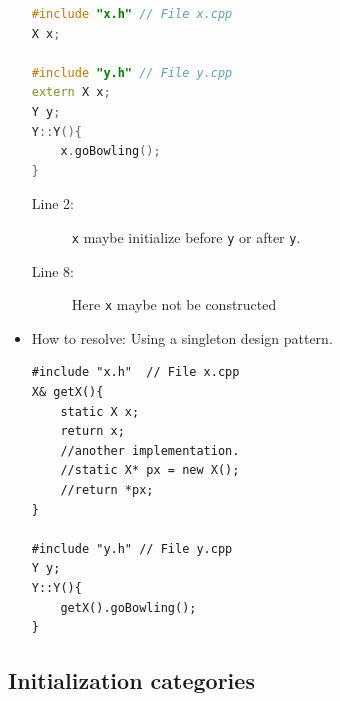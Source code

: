 \documentclass[a4paper,11pt,twoside]{book}
\begin{document}
\begin{itemize}
\begin{lstlisting}[frame=single, language=c++]
#include "x.h" // File x.cpp
X x;
	
#include "y.h" // File y.cpp
extern X x;
Y y;
Y::Y(){ 
	x.goBowling();
}
\end{lstlisting}
\begin{description}
	\item[Line 2:] \texttt{x} maybe initialize before \texttt{y} or after \texttt{y}.
	\item[Line 8:] Here \texttt{x} maybe not be constructed
\end{description}
	
	\item  How to resolve: Using a singleton design pattern.
	\begin{lstlisting}[numbers=none]
#include "x.h"  // File x.cpp
X& getX(){
	static X x;
	return x;
	//another implementation.
	//static X* px = new X();
	//return *px;
}
	
#include "y.h" // File y.cpp
Y y;
Y::Y(){
	getX().goBowling();
}
\end{lstlisting}
\end{itemize}


\subsection{Initialization  categories}
\end{document}
